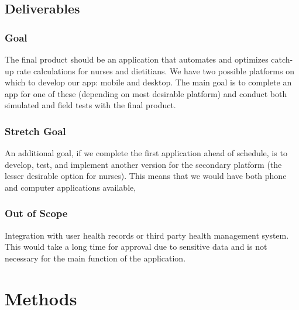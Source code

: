 \documentclass[onecolumn, draftclsnofoot,10pt, compsoc]{IEEEtran}
\begin{document}
\subsection{Deliverables}
\subsubsection{Goal}
The final product should be an application that automates and optimizes catch-up rate calculations for nurses and dietitians. We have two possible platforms on which to develop our app: mobile and desktop. The main goal is to complete an app for one of these (depending on most desirable platform) and conduct both simulated and field tests with the final product.
\subsubsection{Stretch Goal}
An additional goal, if we complete the first application ahead of schedule, is to develop, test, and implement another version for the secondary platform (the lesser desirable option for nurses). This means that we would have both phone and computer applications available,
\subsubsection{Out of Scope}
Integration with user health records or third party health management system. This would take a long time for approval due to sensitive data and is not necessary for the main function of the application.
\section{Methods}
\end{document}
